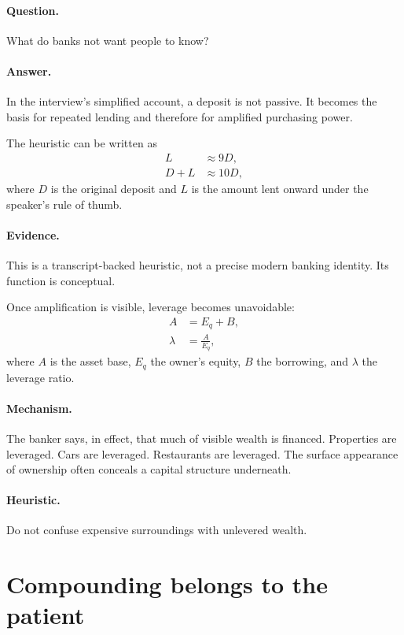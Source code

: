 \documentclass[11pt,oneside]{book}
\begin{document}
\paragraph{Question.} What do banks not want people to know?

\paragraph{Answer.} In the interview's simplified account, a deposit is not passive. It becomes the basis for repeated lending and therefore for amplified purchasing power.

The heuristic can be written as
\begin{align}
L &\approx 9D,\\
D+L &\approx 10D,
\end{align}
where \(D\) is the original deposit and \(L\) is the amount lent onward under the speaker's rule of thumb.

\paragraph{Evidence.} This is a transcript-backed heuristic, not a precise modern banking identity. Its function is conceptual.

Once amplification is visible, leverage becomes unavoidable:
\begin{align}
A &= E_q + B,\\
\lambda &= \frac{A}{E_q},
\end{align}
where \(A\) is the asset base, \(E_q\) the owner's equity, \(B\) the borrowing, and \(\lambda\) the leverage ratio.

\paragraph{Mechanism.} The banker says, in effect, that much of visible wealth is financed. Properties are leveraged. Cars are leveraged. Restaurants are leveraged. The surface appearance of ownership often conceals a capital structure underneath.

\paragraph{Heuristic.} Do not confuse expensive surroundings with unlevered wealth.

\section{Compounding belongs to the patient}
\end{document}
